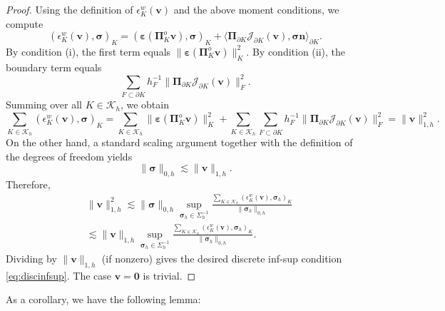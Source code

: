 \documentclass[review,hidelinks,onefignum,onetabnum]{siamart251216}
\begin{document}
\begin{proof}
Using the definition of \(\epsilon_K^w(\boldsymbol{v})\) and the above moment conditions, we compute
\[
(\epsilon_K^w(\boldsymbol{v}), \boldsymbol{\sigma})_K
= (\boldsymbol{\varepsilon}(\boldsymbol{\Pi}_K^o \boldsymbol{v}), \boldsymbol{\sigma})_K
+ \langle \boldsymbol{\Pi}_{\partial K}\mathcal{J}_{\partial K}(\boldsymbol{v}), \boldsymbol{\sigma}\boldsymbol{n} \rangle_{\partial K}.
\]
By condition (i), the first term equals \(\|\boldsymbol{\varepsilon}(\boldsymbol{\Pi}_K^o \boldsymbol{v})\|_K^2\). By condition (ii), the boundary term equals
\[
\sum_{F\subset\partial K} h_F^{-1} \|\boldsymbol{\Pi}_{\partial K}\mathcal{J}_{\partial K}(\boldsymbol{v})\|_F^2.
\]
Summing over all \(K\in\mathcal{K}_h\), we obtain
\[
\sum_{K\in\mathcal{K}_h} (\epsilon_K^w(\boldsymbol{v}), \boldsymbol{\sigma})_K
= \sum_{K\in\mathcal{K}_h} \|\boldsymbol{\varepsilon}(\boldsymbol{\Pi}_K^o \boldsymbol{v})\|_K^2
+ \sum_{K\in\mathcal{K}_h} \sum_{F\subset\partial K} h_F^{-1} \|\boldsymbol{\Pi}_{\partial K}\mathcal{J}_{\partial K}(\boldsymbol{v})\|_F^2
= \|\boldsymbol{v}\|_{1,h}^2.
\]
On the other hand, a standard scaling argument together with the definition of the degrees of freedom yields
\[
\|\boldsymbol{\sigma}\|_{0,h} \lesssim \|\boldsymbol{v}\|_{1,h}.
\]
Therefore,
\begin{equation*}
\begin{aligned}
&\|\boldsymbol{v}\|_{1,h}^2
\lesssim  \|\boldsymbol{\sigma}\|_{0,h}
\sup_{\boldsymbol{\sigma}_h\in\Sigma_h^{-1}}
\frac{\sum_{K\in\mathcal{K}_h} (\epsilon_K^w(\boldsymbol{v}), \boldsymbol{\sigma}_h)_K}{\|\boldsymbol{\sigma}_h\|_{0,h}}\\
&\lesssim \|\boldsymbol{v}\|_{1,h}
\sup_{\boldsymbol{\sigma}_h\in\Sigma_h^{-1}}
\frac{\sum_{K\in\mathcal{K}_h} (\epsilon_K^w(\boldsymbol{v}), \boldsymbol{\sigma}_h)_K}{\|\boldsymbol{\sigma}_h\|_{0,h}}.
\end{aligned}
\end{equation*}
Dividing by \(\|\boldsymbol{v}\|_{1,h}\) (if nonzero) gives the desired discrete inf-sup condition \eqref{eq:discinfsup}. The case \(\boldsymbol{v}=\boldsymbol{0}\) is trivial.
\end{proof}


As a corollary, we have the following lemma:
\end{document}
